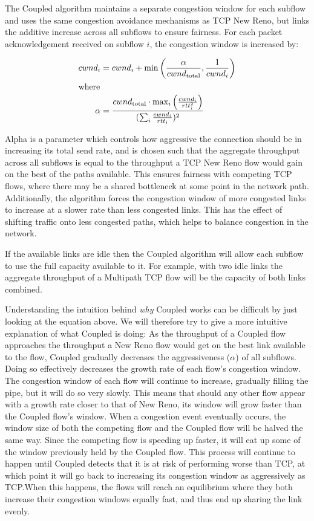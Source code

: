 The Coupled algorithm maintains a separate congestion window for each subflow
and uses the same congestion avoidance mechanisms as TCP New Reno, but links the
additive increase across all subflows to ensure fairness. For each packet
acknowledgement received on subflow $i$, the congestion window is increased by:

\begin{align*}
  cwnd_i &= cwnd_i +
    \min\left(\frac{\alpha}{cwnd_\text{total}}, \frac{1}{cwnd_i}\right) \\
  \intertext{where}
  \alpha &=
    \frac{cwnd_\text{total} \cdot \max_i\left(\frac{cwnd_i}{rtt_i^2}\right)}
         {(\sum_i \frac{cwnd_i}{rtt_i})^2}
\end{align*}

Alpha is a parameter which controls how aggressive the connection should be in
increasing its total send rate, and is chosen such that the aggregate throughput
across all subflows is equal to the throughput a TCP New Reno flow would gain on
the best of the paths available. This ensures fairness with competing TCP flows,
where there may be a shared bottleneck at some point in the network path.
Additionally, the algorithm forces the congestion window of more congested links
to increase at a slower rate than less congested links. This has the effect of
shifting traffic onto less congested paths, which helps to balance congestion in
the network.

If the available links are idle then the Coupled algorithm will allow each
subflow to use the full capacity available to it. For example, with two idle
links the aggregate throughput of a Multipath TCP flow will be the capacity of
both links combined.

Understanding the intuition behind \textit{why} Coupled works can be difficult
by just looking at the equation above. We will therefore try to give a more
intuitive explanation of what Coupled is doing: As the throughput of a Coupled
flow approaches the throughput a New Reno flow would get on the best link
available to the flow, Coupled gradually decreases the aggressiveness ($\alpha$)
of all subflows. Doing so effectively decreases the growth rate of each flow's
congestion window. The congestion window of each flow will continue to increase,
gradually filling the pipe, but it will do so very slowly. This means that
should any other flow appear with a growth rate closer to that of New Reno, its
window will grow faster than the Coupled flow's window. When a congestion event
eventually occurs, the window size of both the competing flow and the Coupled
flow will be halved the same way. Since the competing flow is speeding up
faster, it will eat up some of the window previously held by the Coupled flow.
This process will continue to happen until Coupled detects that it is at risk of
performing worse than TCP, at which point it will go back to increasing its
congestion window as aggressively as TCP.\@ When this happens, the flows will
reach an equilibrium where they both increase their congestion windows equally
fast, and thus end up sharing the link evenly.

